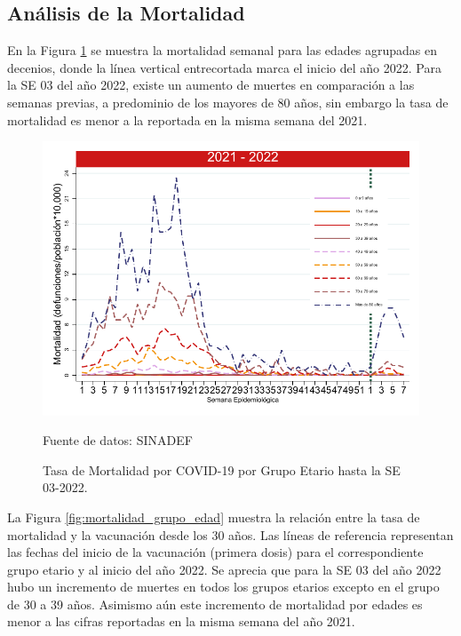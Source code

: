 \documentclass[12pt,a4paper,openany]{book}
\begin{document}
	\subsection*{Análisis de la Mortalidad}

\noindent En la Figura \ref{fig:mortalidad_edad} se muestra la mortalidad semanal para las edades agrupadas en decenios, donde la línea vertical entrecortada marca el inicio del año 2022. Para la SE 03 del año 2022, existe un aumento de muertes en comparación a las semanas previas, a predominio de los mayores de 80 años, sin embargo la tasa de mortalidad es menor a la reportada en la misma semana del 2021. 
	 	
\begin{figure}[h]
	\caption{Tasa de Mortalidad por COVID-19 por Grupo Etario hasta la SE 03-2022.}\label{fig:mortalidad_edad}
	\begin{center}
		\includegraphics[width=0.65\linewidth]{../figuras/mortalidad_edad_2021_2022.pdf}
	\end{center}
	{\footnotesize Fuente de datos: SINADEF} 
\end{figure}


La Figura \ref{fig:mortalidad_grupo_edad} muestra la relación entre la tasa de mortalidad y la vacunación desde los 30 años. Las líneas de referencia representan las fechas del inicio de la vacunación (primera dosis) para el correspondiente grupo etario y al inicio del año 2022. Se aprecia que para la SE 03 del año 2022 hubo un incremento de muertes en todos los grupos etarios excepto en el grupo de 30 a 39 años. Asimismo aún este incremento de mortalidad por edades es menor a las cifras reportadas en la misma semana del año 2021.  
\end{document}
